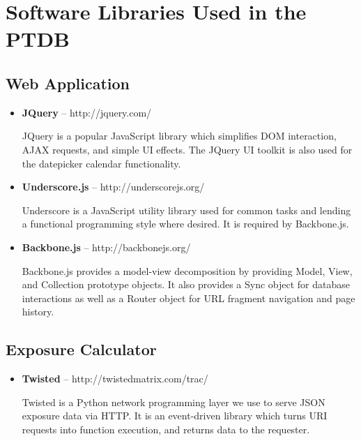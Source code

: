 \documentclass[journal]{IEEEtran}
\begin{document}
%

\appendices
\section{Software Libraries Used in the PTDB}
\subsection{Web Application}
\begin{itemize}
  \item \textbf{JQuery} -- http://jquery.com/

   JQuery is a popular JavaScript library which simplifies 
   DOM interaction, AJAX requests, and simple UI effects.
   The JQuery UI toolkit is also used for the datepicker
   calendar functionality.
  \item \textbf{Underscore.js} -- http://underscorejs.org/

   Underscore is a JavaScript utility library used for common
   tasks and lending a functional programming style where
   desired.
   It is required by Backbone.js.
  \item \textbf{Backbone.js} -- http://backbonejs.org/

   Backbone.js provides a model-view decomposition by providing
   Model, View, and Collection prototype objects. It also provides
   a Sync object for database interactions as well as a Router object
   for URL fragment navigation and page history. 
\end{itemize}
\subsection{Exposure Calculator}
\begin{itemize}
  \item \textbf{Twisted} -- http://twistedmatrix.com/trac/

   Twisted is a Python network programming layer we use to serve
   JSON exposure data via HTTP. It is an event-driven library which
   turns URI requests into function execution, and returns data
   to the requester.
\end{itemize}
\end{document}
